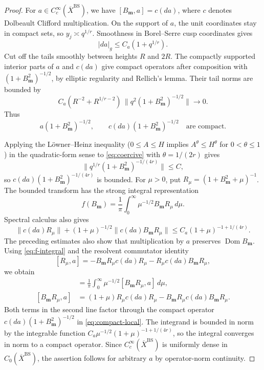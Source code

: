 \documentclass[11pt]{article}
\theoremstyle{definition}
\theoremstyle{plain}
\numberwithin{equation}{section}
\newcommand{\BS}{\mathrm{BS}}
\begin{document}
\begin{proof}
For $a\in C_c^\infty(\overline X^{\BS})$, we have
$[B_{\boldsymbol m},a]=c(da)$, where $c$ denotes
Dolbeault Clifford multiplication.
On the support of $a$, the unit coordinates stay
in compact sets, so $y_j\asymp q^{1/r}$.
Smoothness in Borel--Serre cusp coordinates gives
\[
 |da|_g\leq C_a(1+q^{1/r}).
\]
Cut off the tails smoothly between heights $R$ and $2R$.
The compactly supported interior parts of $a$ and $c(da)$
give compact operators after composition with
$(1+B_{\boldsymbol m}^2)^{-1/2}$, by elliptic regularity
and Rellich's lemma. Their tail norms are bounded by
\[
 C_a(R^{-2}+R^{1/r-2})\,
      \|q^2(1+B_{\boldsymbol m}^2)^{-1/2}\|
 \longrightarrow0.
\]
Thus
\begin{equation}\label{eq:compact-local}
 a(1+B_{\boldsymbol m}^2)^{-1/2},\qquad
 c(da)(1+B_{\boldsymbol m}^2)^{-1/2}
 \quad\text{are compact}.
\end{equation}

Applying the L\"owner--Heinz inequality \cite{KatoHeinz}
($0\leq A\leq H$ implies $A^\theta\leq H^\theta$
for $0<\theta\leq1$) in the quadratic-form sense
to \eqref{eq:coercive} with $\theta=1/(2r)$ gives
\[
 \|q^{1/r}(1+B_{\boldsymbol m}^2)^{-1/(4r)}\|\leq C,
\]
so $c(da)(1+B_{\boldsymbol m}^2)^{-1/(4r)}$ is bounded.
For $\mu>0$, put $R_\mu=(1+B_{\boldsymbol m}^2+\mu)^{-1}$.
The bounded transform has the strong integral representation
\begin{equation}\label{eq:f-integral}
 f(B_{\boldsymbol m})
 =\frac1\pi\int_0^\infty
       \mu^{-1/2}B_{\boldsymbol m}R_\mu\,d\mu.
\end{equation}
Spectral calculus also gives
\[
 \|c(da)R_\mu\|
 +(1+\mu)^{-1/2}\|c(da)B_{\boldsymbol m}R_\mu\|
 \leq C_a(1+\mu)^{-1+1/(4r)}.
\]
The preceding estimates also show that multiplication by $a$
preserves $\operatorname{Dom}B_{\boldsymbol m}$. Using \eqref{eq:f-integral} and the resolvent commutator identity
\[
 [R_\mu,a]
 =-B_{\boldsymbol m}R_\mu c(da)R_\mu
  -R_\mu c(da)B_{\boldsymbol m}R_\mu,
\]
we obtain
\begin{align*}
 [f(B_{\boldsymbol m}),a]
   &=\frac1\pi\int_0^\infty\mu^{-1/2}
                  [B_{\boldsymbol m}R_\mu,a]\,d\mu,\\
 [B_{\boldsymbol m}R_\mu,a]
   &=(1+\mu)R_\mu c(da)R_\mu
     -B_{\boldsymbol m}R_\mu c(da)B_{\boldsymbol m}R_\mu.
\end{align*}
Both terms in the second line factor through the compact operator
$c(da)(1+B_{\boldsymbol m}^2)^{-1/2}$
in \eqref{eq:compact-local}.
The integrand is bounded in norm by the integrable function
$C_a\mu^{-1/2}(1+\mu)^{-1+1/(4r)}$,
so the integral converges in norm to a compact operator.
Since $C_c^\infty(\overline X^{\BS})$ is uniformly dense in
$C_0(\overline X^{\BS})$, the assertion follows for arbitrary $a$
by operator-norm continuity.
\end{proof}
\end{document}
